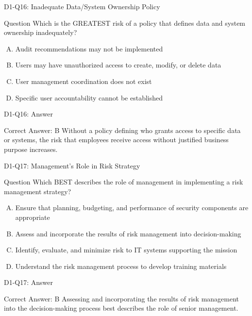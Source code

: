 \documentclass{beamer}
\begin{document}
	\begin{frame}{D1-Q16: Inadequate Data/System Ownership Policy}
		\begin{block}{Question}
			Which is the GREATEST risk of a policy that defines data and system ownership inadequately?
		\end{block}
		\begin{enumerate}[(A)]
			\item Audit recommendations may not be implemented
			\item Users may have unauthorized access to create, modify, or delete data
			\item User management coordination does not exist
			\item Specific user accountability cannot be established
		\end{enumerate}
	\end{frame}
	\begin{frame}{D1-Q16: Answer}
		\begin{block}{Correct Answer: B}
			Without a policy defining who grants access to specific data or systems, the risk that employees receive access without justified business purpose increases.
		\end{block}
	\end{frame}
	
	\begin{frame}{D1-Q17: Management's Role in Risk Strategy}
		\begin{block}{Question}
			Which BEST describes the role of management in implementing a risk management strategy?
		\end{block}
		\begin{enumerate}[(A)]
			\item Ensure that planning, budgeting, and performance of security components are appropriate
			\item Assess and incorporate the results of risk management into decision-making
			\item Identify, evaluate, and minimize risk to IT systems supporting the mission
			\item Understand the risk management process to develop training materials
		\end{enumerate}
	\end{frame}
	\begin{frame}{D1-Q17: Answer}
		\begin{block}{Correct Answer: B}
			Assessing and incorporating the results of risk management into the decision-making process best describes the role of senior management.
		\end{block}
	\end{frame}
	
\end{document}
